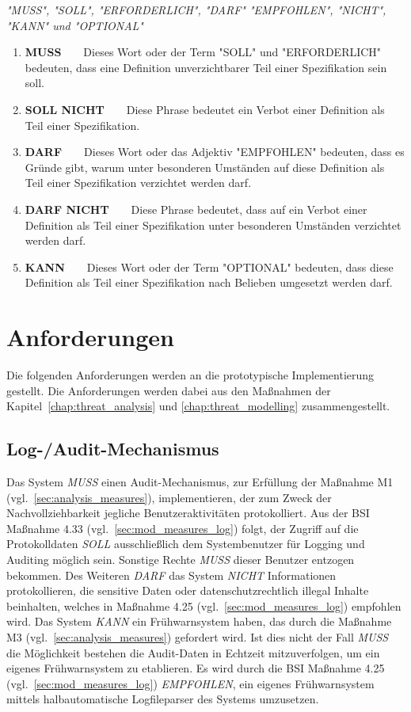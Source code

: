 \documentclass[11pt,a4paper]{report}
\begin{document}
\begin{center}
\textit{"MUSS", "SOLL", "ERFORDERLICH", "DARF" "EMPFOHLEN", "NICHT", "KANN" und "OPTIONAL"}
\end{center} 

\begin{enumerate}
\item \textbf{MUSS}~~~~Dieses Wort oder der Term "SOLL" und "ERFORDERLICH" bedeuten, dass eine  Definition unverzichtbarer Teil einer Spezifikation sein soll.
\item \textbf{SOLL NICHT}~~~~Diese Phrase bedeutet ein Verbot einer Definition als Teil einer Spezifikation.
\item \textbf{DARF}~~~~Dieses Wort oder das Adjektiv "EMPFOHLEN" bedeuten, dass es  Gründe gibt, warum unter besonderen Umständen auf diese Definition als Teil einer Spezifikation verzichtet werden darf. 
\item \textbf{DARF NICHT}~~~~Diese Phrase bedeutet, dass auf ein Verbot einer Definition als Teil einer Spezifikation unter besonderen Umständen verzichtet werden darf.
\item \textbf{KANN}~~~~Dieses Wort oder der Term "OPTIONAL" bedeuten, dass diese Definition als Teil einer Spezifikation nach Belieben umgesetzt werden darf.
\end{enumerate}

\section{Anforderungen}

Die folgenden Anforderungen werden an die prototypische Implementierung gestellt. Die Anforderungen werden dabei aus den Maßnahmen der Kapitel~\ref{chap:threat_analysis} und \ref{chap:threat_modelling} zusammengestellt.

\subsection{Log-/Audit-Mechanismus}

Das System \textit{MUSS} einen Audit-Mechanismus, zur Erfüllung der Maßnahme M1 (vgl.~\ref{sec:analysis_measures}), implementieren, der zum Zweck der Nachvollziehbarkeit jegliche Benutzeraktivitäten protokolliert. Aus der BSI Maßnahme 4.33 (vgl.~\ref{sec:mod_measures_log}) folgt, der Zugriff auf die Protokolldaten \textit{SOLL} ausschließlich dem Systembenutzer für Logging und Auditing möglich sein. Sonstige Rechte \textit{MUSS} dieser Benutzer entzogen bekommen. Des Weiteren \textit{DARF} das System \textit{NICHT} Informationen protokollieren, die sensitive Daten oder datenschutzrechtlich illegal Inhalte beinhalten, welches in Maßnahme 4.25 (vgl.~\ref{sec:mod_measures_log}) empfohlen wird. Das System \textit{KANN} ein Frühwarnsystem haben, das durch die Maßnahme M3 (vgl.~\ref{sec:analysis_measures}) gefordert wird. Ist dies nicht der Fall \textit{MUSS} die Möglichkeit bestehen die Audit-Daten in Echtzeit mitzuverfolgen, um ein eigenes Frühwarnsystem zu etablieren. Es wird durch die BSI Maßnahme 4.25 (vgl.~\ref{sec:mod_measures_log}) \textit{EMPFOHLEN}, ein eigenes Frühwarnsystem mittels halbautomatische Logfileparser des Systems umzusetzen.
\end{document}
